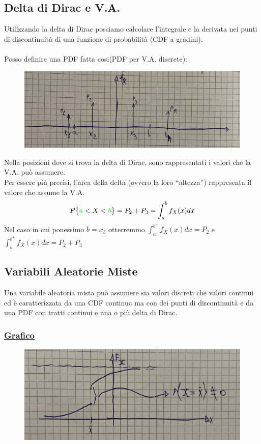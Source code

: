 \documentclass{article}
\begin{document}
\subsection{Delta di Dirac e V.A.}
Utilizzando la delta di Dirac possiamo calcolare l’integrale e la derivata nei punti di discontinuità di una funzione di probabilità (CDF a gradini). \\ \\
Posso definire una PDF fatta cosi(PDF per V.A. discrete):
\begin{figure}[ht]
\centering
\includegraphics[scale=0.12]{images/33.V.A.Dirac.jpeg}
\end{figure}
Nella posizioni dove si trova la delta di Dirac, sono rappresentati i valori che la V.A. può assumere. \\
Per essere più precisi, l’area della delta (ovvero la loro “altezza”) rappresenta il valore che assume la V.A.
\[P \big\{ {\color{green}a} < X < {\color{green}b} \big\} = P_2 + P_3 = \int_{a}^{b} f_X (x) dx\]
Nel caso in cui ponessimo $b = x_3$ otterremmo $\int_{a}^{b^-} f_X(x) dx = P_2$ e $\int_{a}^{b^+} f_X(x) dx = P_2 + P_3$

\subsection{Variabili Aleatorie Miste}
Una variabile aleatoria mista può assumere sia valori discreti che valori continui ed è caratterizzata da una CDF continua ma con dei punti di discontinuità e da una PDF con tratti continui e una o più delta di Dirac.
\subsubsection{\underline{Grafico}}
\begin{figure}[ht]
\centering
\includegraphics[scale=0.12]{images/34.VA_Miste.jpeg}
\end{figure}
\end{document}
